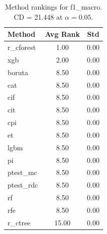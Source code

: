 \begin{table}[h]
\centering
\caption{Method rankings for f1_macro. CD = 21.448 at $\alpha=0.05$.}
\label{tab:ranks_f1_macro}
\begin{tabular}{lcc}
\toprule
Method & Avg Rank & Std \\
\midrule
r_cforest & 1.00 & 0.00 \\
xgb & 2.00 & 0.00 \\
boruta & 8.50 & 0.00 \\
cat & 8.50 & 0.00 \\
cif & 8.50 & 0.00 \\
cit & 8.50 & 0.00 \\
cpi & 8.50 & 0.00 \\
et & 8.50 & 0.00 \\
lgbm & 8.50 & 0.00 \\
pi & 8.50 & 0.00 \\
ptest_mc & 8.50 & 0.00 \\
ptest_rdc & 8.50 & 0.00 \\
rf & 8.50 & 0.00 \\
rfe & 8.50 & 0.00 \\
r_ctree & 15.00 & 0.00 \\
\bottomrule
\end{tabular}
\end{table}